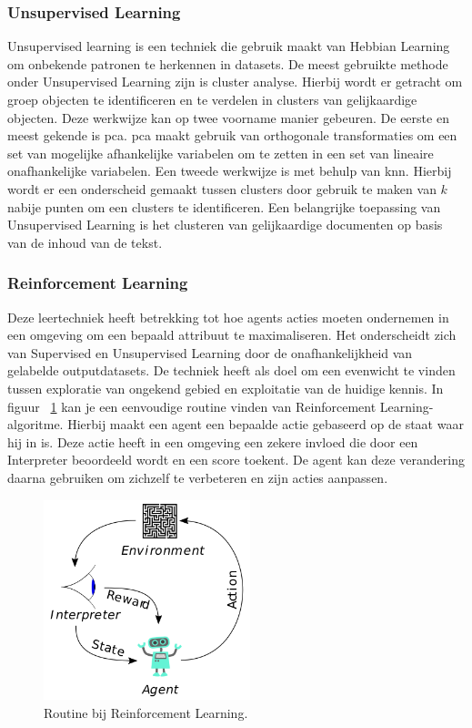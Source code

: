 		\subsubsection{Unsupervised Learning} Unsupervised learning is een techniek die gebruik maakt van Hebbian Learning om onbekende patronen te herkennen in datasets. De meest gebruikte methode onder Unsupervised Learning zijn is  cluster analyse. Hierbij wordt er getracht om groep objecten te identificeren en te verdelen in clusters van gelijkaardige objecten. Deze werkwijze kan op twee voorname manier gebeuren. De eerste en meest gekende is \gls{pca}. \gls{pca} maakt gebruik van orthogonale transformaties om een set van mogelijke afhankelijke variabelen om te zetten in een set van lineaire onafhankelijke variabelen. Een tweede werkwijze is met behulp van \gls{knn}. Hierbij wordt er een onderscheid gemaakt tussen clusters door gebruik te maken van $k$ nabije punten om een clusters te identificeren. Een belangrijke toepassing van Unsupervised Learning is het clusteren van gelijkaardige documenten op basis van de inhoud van de tekst.
		
	
		\newpage
			
		\subsubsection{Reinforcement Learning} Deze leertechniek heeft betrekking tot hoe agents acties moeten ondernemen in een omgeving om een bepaald attribuut te maximaliseren. Het onderscheidt zich van Supervised en Unsupervised Learning door de onafhankelijkheid van gelabelde outputdatasets. De techniek heeft als doel om een evenwicht te vinden tussen exploratie van ongekend gebied en exploitatie van de huidige kennis. In figuur ~\ref{fig:reinforcemntLearning} kan je een eenvoudige routine vinden van Reinforcement Learning-algoritme. Hierbij maakt een agent een bepaalde actie gebaseerd op de staat waar hij in is. Deze actie heeft in een omgeving een zekere invloed die door een Interpreter beoordeeld wordt en een score toekent. De agent kan deze verandering daarna gebruiken om zichzelf te verbeteren en zijn acties aanpassen. 
		
		\begin{figure}
			\centering
			\includegraphics[width=60mm]{afbeeldingen/Reinforcement_learning_diagram.PNG}
			\caption[Routine bij Reinforcement Learning.]{Routine bij Reinforcement Learning.\cite{bron:reinforcementlearning}}
			\label{fig:reinforcemntLearning}
		\end{figure}
		
